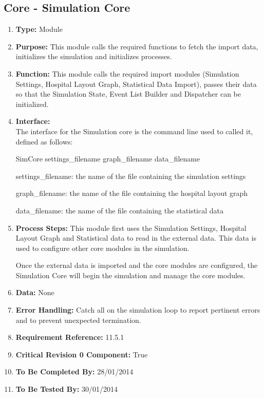 \documentclass[paper=letter, fontsize=10pt]{scrartcl}
\numberwithin{equation}{section}		%
\numberwithin{figure}{section}			%
\numberwithin{table}{section}				%
\begin{document}
\subsection{Core - Simulation Core}
\begin{enumerate}[]
	\item \textbf{Type:} Module
	\item \textbf{Purpose:} This module calls the required functions to fetch the import data, initializes the simulation and initializes processes.
	\item \textbf{Function:} This module calls the required import modules (Simulation Settings, Hospital Layout Graph, Statistical Data Import), passes their data so that the Simulation State, Event List Builder and Dispatcher can be initialized.
	\item \textbf{Interface:}\\ 
	The interface for the Simulation core is the command line used to called it, defined as follows:
	
	SimCore settings\_filename graph\_filename data\_filename
	
	settings\_filename: the name of the file containing the simulation settings
	
	graph\_filename: the name of the file containing the hospital layout graph
	
	data\_filename: the name of the file containing the statistical data
	
	\item \textbf{Process Steps:} This module first uses the Simulation Settings, Hospital Layout Graph and Statistical data to read in the external data.  This data is used to configure other core modules in the simulation.
	
	Once the external data is imported and the core modules are configured, the Simulation Core will begin the simulation and manage the core modules.
	\item \textbf{Data:} None
	\item \textbf{Error Handling:} Catch all on the simulation loop to report pertinent errors and to prevent unexpected termination. 
	\item \textbf{Requirement Reference:} 11.5.1
	\item \textbf{Critical Revision 0 Component:} True
	\item \textbf{To Be Completed By:} 28/01/2014
	\item \textbf{To Be Tested By:} 30/01/2014
\end{enumerate}
\end{document}
